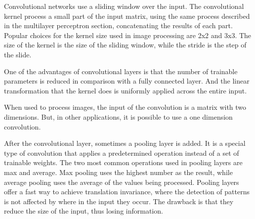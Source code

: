 Convolutional networks \cite{lecun_backpropagation_1989}\cite{lecun_convolutional_1995} use a sliding window over the input. The convolutional kernel process a small part of the input matrix, using the same process described in the multilayer perceptron section, concatenating the results of each part. Popular choices for the kernel size used in image processing are 2x2 and 3x3. The size of the kernel is the size of the sliding window, while the stride is the step of the slide.

One of the advantages of convolutional layers is that the number of trainable parameters is reduced in comparison with a fully connected layer. And the linear transformation that the kernel does is uniformly applied across the entire input.

When used to process images, the input of the convolution is a matrix with two dimensions. But, in other applications, it is possible to use a one dimension convolution.

After the convolutional layer, sometimes a pooling layer is added. It is a special type of convolution that applies a predetermined operation instead of a set of trainable weights. The two most common operations used in pooling layers are max and average. Max pooling uses the highest number as the result, while average pooling uses the average of the values being processed. Pooling layers offer a fast way to achieve translation invariance, where the detection of patterns is not affected by where in the input they occur. The drawback is that they reduce the size of the input, thus losing information.